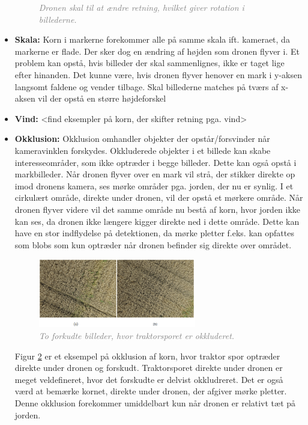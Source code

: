\begin{itemize}
{\begin{figure}[H]
     \vspace{-1em}
    \begin{center}    
       \caption{\textcolor{gray}{\footnotesize \textit{Dronen skal til at ændre retning, hvilket giver rotation i billederne.}}}
    \label{fig:rotation}
     \end{center}
     \vspace{-2.5em}
  \end{figure} \noindent
}
\item{\textbf{Skala:} Korn i markerne forekommer alle på samme skala ift. kameraet, da markerne er flade. Der sker dog en ændring af højden som dronen flyver i. Et problem kan opstå, hvis billeder der skal sammenlignes, ikke er taget lige efter hinanden. Det kunne være, hvis dronen flyver henover en mark i y-aksen langsomt faldene og vender tilbage. Skal billederne matches på tværs af x-aksen vil der opstå en større højdeforskel}
\item{\textbf{Vind:} <find eksempler på korn, der skifter retning pga. vind> }
\item{\textbf{Okklusion:}
Okklusion omhandler objekter der opstår/forsvinder når kameravinklen forskydes. Okkluderede objekter i et billede kan skabe interesseområder, som ikke optræder i begge billeder. Dette kan også opstå i markbilleder. Når dronen flyver over en mark vil strå, der stikker direkte op imod dronens kamera, ses mørke områder pga. jorden, der nu er synlig. I et cirkulært område, direkte under dronen, vil der opstå et mørkere område. Når dronen flyver videre vil det samme område nu bestå af korn, hvor jorden ikke kan ses, da dronen ikke længere kigger direkte ned i dette område. Dette kan have en stor indflydelse på detektionen, da mørke pletter f.eks. kan opfattes som blobs som kun optræder når dronen befinder sig direkte over området. 
\begin{figure}[H]
    \centering
    \includegraphics[width=0.65\textwidth]{fig/18.png}
     \vspace{-1em}
    \begin{center}    
       \caption{\textcolor{gray}{\footnotesize \textit{ To forkudte billeder, hvor traktorsporet er okkluderet. }}}
    \label{fig:okklusion}
     \end{center}
     \vspace{-2.5em}
  \end{figure} \noindent
Figur \ref{fig:okklusion} er et eksempel på okklusion af korn, hvor traktor spor optræder direkte under dronen og forskudt. Traktorsporet direkte under dronen er meget veldefineret, hvor det forskudte er delvist okkludreret. Det er også værd at bemærke kornet, direkte under dronen, der afgiver mørke pletter. Denne okklusion forekommer umiddelbart kun når dronen er relativt tæt på jorden.}
\end{itemize}
